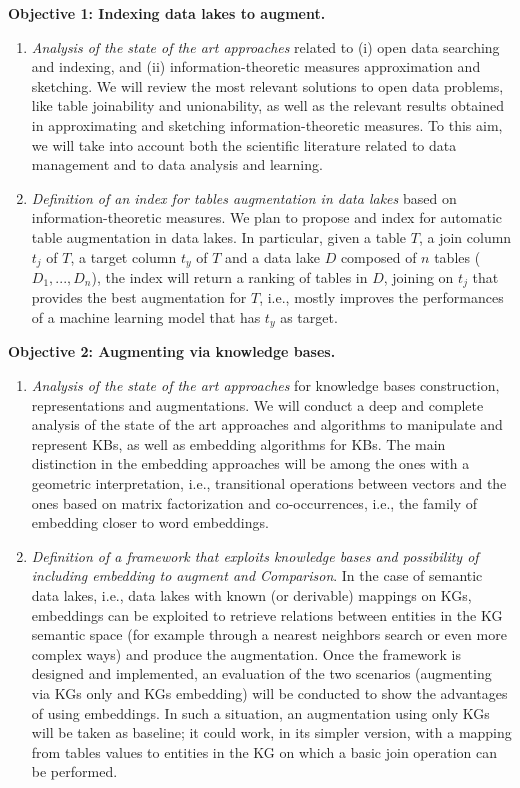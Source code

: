 \noindent\textbf{Objective 1: Indexing data lakes to augment.}
\begin{enumerate}
    \item \textit{Analysis of the state of the art approaches} related to (i) open data searching and indexing, and (ii) information-theoretic measures approximation and sketching. We will review the most relevant solutions to open data problems, like table joinability and unionability, as well as the relevant results obtained in approximating and sketching information-theoretic measures. To this aim, we will take into account both the scientific literature related to data management and to data analysis and learning.
    \item \textit{Definition of an index for tables augmentation in data lakes} based on information-theoretic measures. We plan to propose and index for automatic table augmentation in data lakes. In particular, given a table $T$, a join column $t_j$ of $T$, a target column $t_y$ of $T$ and a data lake $D$ composed of $n$ tables ($D_1,...,D_n$), the index will return a ranking of tables in $D$, joining on $t_j$ that provides the best augmentation for $T$, i.e., mostly improves the performances of a machine learning model that has $t_y$ as target.
\end{enumerate}

\noindent\textbf{Objective 2: Augmenting via knowledge bases.}
\begin{enumerate}
    \item \textit{Analysis of the state of the art approaches} for knowledge bases construction, representations and augmentations. We will conduct a deep and complete analysis of the state of the art approaches and algorithms to manipulate and represent KBs, as well as embedding algorithms for KBs. The main distinction in the embedding approaches will be among the ones with a geometric interpretation, i.e., transitional operations between vectors and the ones based on matrix factorization and co-occurrences, i.e., the family of embedding closer to word embeddings.
    \item \textit{Definition of a framework that exploits knowledge bases and possibility of including embedding to augment and Comparison}. In the case of semantic data lakes, i.e., data lakes with known (or derivable) mappings on KGs, embeddings can be exploited to retrieve relations between entities in the KG semantic space (for example through a nearest neighbors search or even more complex ways) and produce the augmentation. Once the framework is designed and implemented, an evaluation of the two scenarios (augmenting via KGs only and KGs embedding) will be conducted to show the advantages of using embeddings. In such a situation, an augmentation using only KGs will be taken as baseline; it could work, in its simpler version, with a mapping from tables values to entities in the KG on which a basic join operation can be performed.
\end{enumerate}

